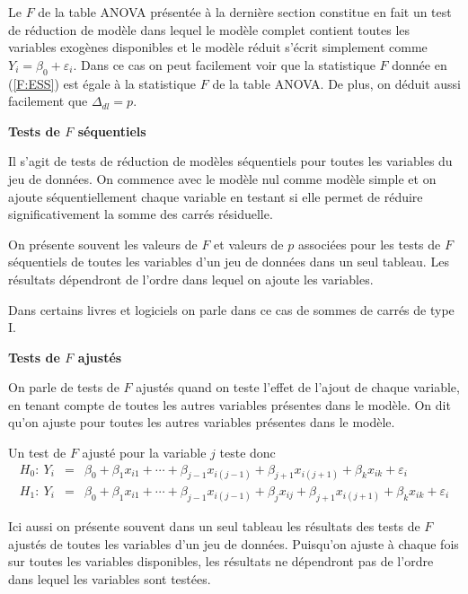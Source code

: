 Le $F$ de la table ANOVA présentée à la dernière section constitue en fait un test de réduction de modèle dans lequel le mod\`ele complet contient toutes les variables exogènes disponibles et le modèle réduit s'écrit simplement comme $Y_i=\beta_0+\varepsilon_i$.  Dans ce cas on peut facilement voir que la statistique $F$ donnée en (\ref{F:ESS}) est égale \`a la statistique $F$ de la table ANOVA. De plus, on déduit aussi facilement que $\Delta_{dl}=p$.

\newpage
\textbf{Tests de $F$ séquentiels}

Il s'agit de tests de réduction de modèles séquentiels pour toutes les variables du jeu de données. On commence avec le modèle nul comme modèle simple et on ajoute séquentiellement chaque variable en testant si elle permet de réduire significativement la somme des carrés résiduelle.

On présente souvent les valeurs de $F$ et valeurs de $p$ associées pour les tests de $F$ séquentiels de toutes les variables d'un jeu de données dans un seul tableau. Les résultats dépendront de l'ordre dans lequel on ajoute les variables.

\begin{remarque}
Dans certains livres et logiciels on parle dans ce cas de sommes de carrés de type I.
\end{remarque}


\textbf{Tests de $F$ ajustés}

On parle de tests de $F$ ajustés quand on teste l'effet de l'ajout de chaque variable, en tenant compte de toutes les autres variables présentes dans le modèle. On dit qu'on ajuste pour toutes les autres variables présentes dans le modèle.

Un test de $F$ ajusté pour la variable $j$ teste donc
\begin{eqnarray*}
H_0:~Y_i&=&\beta_0+\beta_1x_{i1}+\cdots+ \beta_{j-1}x_{i(j-1)} + \beta_{j+1}x_{i(j+1)}+ \beta_kx_{ik}+\varepsilon_i\\
H_1:~Y_i&=&\beta_0+\beta_1x_{i1}+\cdots+ \beta_{j-1}x_{i(j-1)} + \beta_{j}x_{ij}+ \beta_{j+1}x_{i(j+1)}+ \beta_kx_{ik}+\varepsilon_i
\end{eqnarray*}

Ici aussi on présente souvent dans un seul tableau les résultats des tests de $F$ ajustés de toutes les variables d'un jeu de données. Puisqu'on ajuste à chaque fois sur toutes les variables disponibles, les résultats ne dépendront pas de l'ordre dans lequel les variables sont testées.

